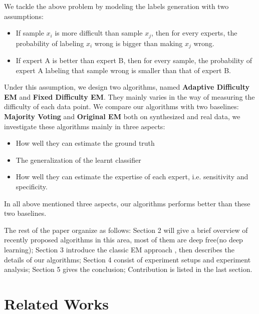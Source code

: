 \documentclass{article}
\begin{document}
We tackle the above problem by modeling the labels generation with two assumptions:
\begin{itemize}
    \item If sample $x_i$ is more difficult than sample $x_j$, then for every experts, the probability of labeling $x_i$ wrong is bigger than making $x_j$ wrong.
    \item If expert A is better than expert B, then for every sample, the probability of expert A labeling that sample wrong is smaller than that of expert B.
\end{itemize}

Under this assumption, we design two algorithms, named \textbf{Adaptive Difficulty EM} and \textbf{Fixed Difficulty EM}. They mainly varies in the way of measuring the difficulty of each data point. We compare our algorithms with two baselines: \textbf{Majority Voting} and \textbf{Original EM} \cite{raykar2010learning} both  on synthesized and real data, we investigate these algorithms mainly in three aspects:
 \begin{itemize}
    \item How well they can estimate the ground truth
    \item The generalization of the learnt classifier
    \item How well they can estimate the expertise of each expert, i.e. sensitivity and specificity.
 \end{itemize}
 
In all above mentioned three aspects, our algorithms performs better than these two baselines.

The rest of the paper organize as follows:
Section 2 will give a brief overview of recently proposed algorithms in this area, most of them are deep free(no deep learning); Section 3 introduce the classic EM approach \cite{raykar2010learning}, then describes the details of our algorithms;  Section 4 consist of experiment setups and experiment analysis;  Section 5 gives the conclusion; Contribution is listed in the last section.



\section{Related Works}
\end{document}
